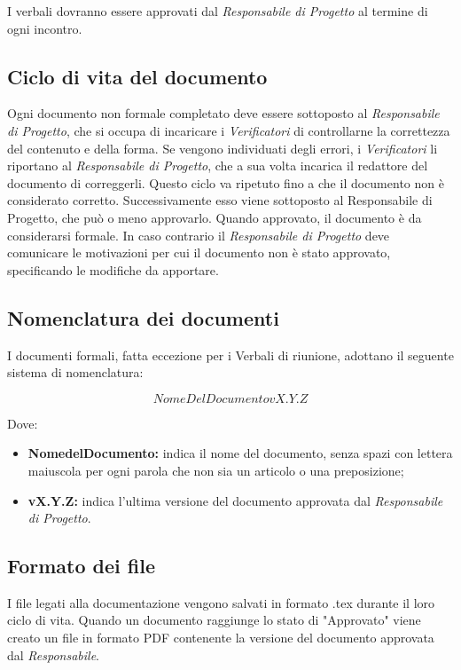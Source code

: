 \documentclass[../NormediProgetto.tex]{subfiles}
\begin{document}
\noindent I verbali dovranno essere approvati dal \textit{Responsabile di Progetto} al termine di ogni incontro.

\subsection{Ciclo di vita del documento}

Ogni documento non formale completato deve essere sottoposto al \textit{Responsabile di Progetto}, che si occupa di incaricare i \textit{Verificatori} di controllarne la correttezza del contenuto e della forma. Se vengono individuati degli errori, i \textit{Verificatori} li riportano al \textit{Responsabile di Progetto}, che a sua volta incarica il redattore del documento di correggerli. Questo ciclo va ripetuto fino a che il documento non è considerato corretto. Successivamente esso viene sottoposto al Responsabile di Progetto, che può o meno approvarlo. Quando approvato, il documento è da considerarsi formale. In caso contrario il \textit{Responsabile di Progetto} deve comunicare le motivazioni per cui il documento non è stato approvato, specificando le modifiche da apportare.

\subsection{Nomenclatura dei documenti}

I documenti formali, fatta eccezione per i Verbali di riunione, adottano il seguente sistema di nomenclatura:

\[NomeDelDocumento vX.Y.Z\]

Dove:

\begin{itemize}
    \item \textbf{NomedelDocumento:} indica il nome del documento, senza spazi con lettera maiuscola per ogni parola che non sia un articolo o una preposizione;
    
    \item \textbf{vX.Y.Z:}  indica l'ultima versione del documento approvata dal \textit{Responsabile di Progetto}.
\end{itemize}

\subsection{Formato dei file}
I file legati alla documentazione vengono salvati in formato .tex durante il loro ciclo di vita. Quando un documento raggiunge lo stato di "Approvato" viene creato un file in formato PDF contenente la versione del documento approvata dal \textit{Responsabile}.
\end{document}
